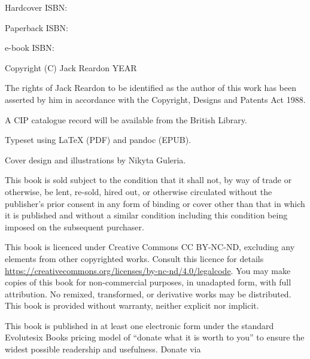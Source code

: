 Hardcover ISBN:

Paperback ISBN:

e-book ISBN:

Copyright (C) Jack Reardon YEAR

The rights of Jack Reardon to be identified as the author of this work
has been asserted by him in accordance with the Copyright, Designs and
Patents Act 1988.

A CIP catalogue record will be available from the British Library.

Typeset using LaTeX (PDF) and pandoc (EPUB).

Cover design and illustrations by Nikyta Guleria.

This book is sold subject to the condition that it shall not, by way of
trade or otherwise, be lent, re-sold, hired out, or otherwise circulated
without the publisher's prior consent in any form of binding or cover
other than that in which it is published and without a similar condition
including this condition being imposed on the subsequent purchaser.

This book is licenced under Creative Commons CC BY-NC-ND, excluding any
elements from other copyrighted works. Consult this licence for details
\url{https://creativecommons.org/licenses/by-nc-nd/4.0/legalcode}. You
may make copies of this book for non-commercial purposes, in unadapted
form, with full attribution. No remixed, transformed, or derivative
works may be distributed. This book is provided without warranty,
neither explicit nor implicit.

This book is published in at least one electronic form under the
standard Evolutesix Books pricing model of ``donate what it is worth to
you'' to ensure the widest possible readership and usefulness. Donate
via
